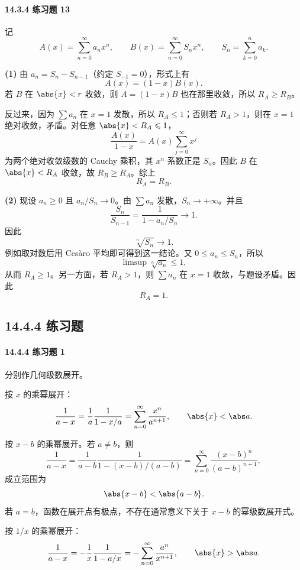\paragraph{14.3.4 练习题 13}
\begin{xsolution}
记
\[
  A(x)=\sum_{n=0}^{\infty}a_nx^n,
  \qquad
  B(x)=\sum_{n=0}^{\infty}S_nx^n,
  \qquad S_n=\sum_{k=0}^na_k.
\]

\textbf{(1)} 由 $a_n=S_n-S_{n-1}$（约定 $S_{-1}=0$），形式上有
\[
  A(x)=(1-x)B(x).
\]
若 $B$ 在 $\abs{x}<r$ 收敛，则 $A=(1-x)B$ 也在那里收敛，所以 $R_A\geqslant R_B$。

反过来，因为 $\sum a_n$ 在 $x=1$ 发散，所以 $R_A\leqslant1$；否则若 $R_A>1$，则在 $x=1$ 绝对收敛，矛盾。对任意 $\abs{x}<R_A\leqslant1$，
\[
  \frac{A(x)}{1-x}=A(x)\sum_{j=0}^{\infty}x^j
\]
为两个绝对收敛级数的 Cauchy 乘积，其 $x^n$ 系数正是 $S_n$。因此 $B$ 在 $\abs{x}<R_A$ 收敛，故 $R_B\geqslant R_A$。综上
\[
  \boxed{R_A=R_B}.
\]

\textbf{(2)} 现设 $a_n\geqslant0$ 且 $a_n/S_n\to0$。由 $\sum a_n$ 发散，$S_n\to+\infty$。并且
\[
  \frac{S_n}{S_{n-1}}
  =\frac1{1-a_n/S_n}\to1.
\]
因此
\[
  \sqrt[n]{S_n}\to1.
\]
例如取对数后用 Cesàro 平均即可得到这一结论。又 $0\leqslant a_n\leqslant S_n$，所以
\[
  \limsup\sqrt[n]{a_n}\leqslant1,
\]
从而 $R_A\geqslant1$。另一方面，若 $R_A>1$，则 $\sum a_n$ 在 $x=1$ 收敛，与题设矛盾。因此
\[
  \boxed{R_A=1}.
\]
\end{xsolution}

\subsection*{14.4.4 练习题}

\paragraph{14.4.4 练习题 1}
\begin{xsolution}
分别作几何级数展开。

按 $x$ 的乘幂展开：
\[
  \frac1{a-x}=\frac1a\frac1{1-x/a}
  =\sum_{n=0}^{\infty}\frac{x^n}{a^{n+1}},
  \qquad \abs{x}<\abs a.
\]

按 $x-b$ 的乘幂展开。若 $a\ne b$，则
\[
  \frac1{a-x}
  =\frac1{a-b}\frac1{1-(x-b)/(a-b)}
  =\sum_{n=0}^{\infty}\frac{(x-b)^n}{(a-b)^{n+1}},
\]
成立范围为
\[
  \abs{x-b}<\abs{a-b}.
\]
若 $a=b$，函数在展开点有极点，不存在通常意义下关于 $x-b$ 的幂级数展开式。

按 $1/x$ 的乘幂展开：
\[
  \frac1{a-x}
  =-\frac1x\frac1{1-a/x}
  =-\sum_{n=0}^{\infty}\frac{a^n}{x^{n+1}},
  \qquad \abs{x}>\abs a.
\]
\end{xsolution}

